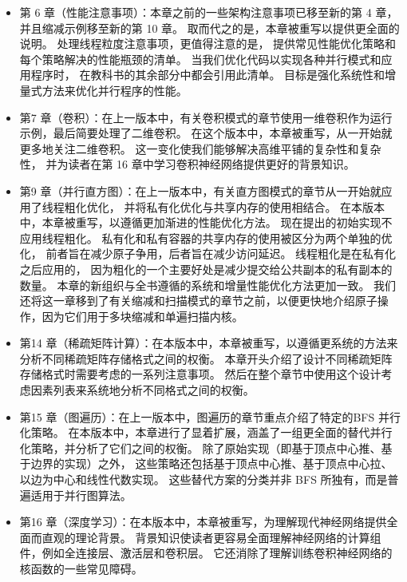 \begin{itemize}
	\item 第 6 章（性能注意事项）：本章之前的一些架构注意事项已移至新的第 4 章，并且缩减示例移至新的第 10 章。
		取而代之的是，本章被重写以提供更全面的说明。 处理线程粒度注意事项，更值得注意的是，
		提供常见性能优化策略和每个策略解决的性能瓶颈的清单。 当我们优化代码以实现各种并行模式和应用程序时，
		在教科书的其余部分中都会引用此清单。 目标是强化系统性和增量式方法来优化并行程序的性能。

	\item 第7 章（卷积）：在上一版本中，有关卷积模式的章节使用一维卷积作为运行示例，最后简要处理了二维卷积。 
		在这个版本中，本章被重写，从一开始就更多地关注二维卷积。 这一变化使我们能够解决高维平铺的复杂性和复杂性，
		并为读者在第 16 章中学习卷积神经网络提供更好的背景知识。

	\item 第9 章（并行直方图）：在上一版本中，有关直方图模式的章节从一开始就应用了线程粗化优化，
		并将私有化优化与共享内存的使用相结合。 在本版本中，本章被重写，以遵循更加渐进的性能优化方法。 
		现在提出的初始实现不应用线程粗化。 私有化和私有容器的共享内存的使用被区分为两个单独的优化，
		前者旨在减少原子争用，后者旨在减少访问延迟。 线程粗化是在私有化之后应用的，
		因为粗化的一个主要好处是减少提交给公共副本的私有副本的数量。 
		本章的新组织与全书遵循的系统和增量性能优化方法更加一致。 
		我们还将这一章移到了有关缩减和扫描模式的章节之前，以便更快地介绍原子操作，因为它们用于多块缩减和单遍扫描内核。

	\item 第14 章（稀疏矩阵计算）：在本版本中，本章被重写，以遵循更系统的方法来分析不同稀疏矩阵存储格式之间的权衡。 
		本章开头介绍了设计不同稀疏矩阵存储格式时需要考虑的一系列注意事项。 
		然后在整个章节中使用这个设计考虑因素列表来系统地分析不同格式之间的权衡。

	\item 第15 章（图遍历）：在上一版本中，图遍历的章节重点介绍了特定的BFS 并行化策略。 
		在本版本中，本章进行了显着扩展，涵盖了一组更全面的替代并行化策略，并分析了它们之间的权衡。 
		除了原始实现（即基于顶点中心推、基于边界的实现）之外，
		这些策略还包括基于顶点中心推、基于顶点中心拉、以边为中心和线性代数实现。 
		这些替代方案的分类并非 BFS 所独有，而是普遍适用于并行图算法。

	\item 第16 章（深度学习）：在本版本中，本章被重写，为理解现代神经网络提供全面而直观的理论背景。 
		背景知识使读者更容易全面理解神经网络的计算组件，例如全连接层、激活层和卷积层。 
		它还消除了理解训练卷积神经网络的核函数的一些常见障碍。


\end{itemize}

